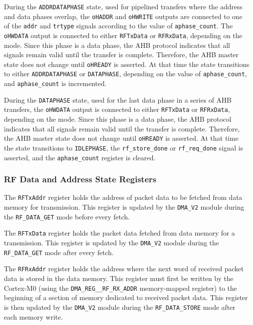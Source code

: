 During the \texttt{ADDRDATAPHASE} state, used for pipelined transfers where the address and data phases overlap, the \texttt{oHADDR} and \texttt{oHWRITE} outputs are connected to one of the \texttt{addr} and \texttt{trtype} signals according to the value of \texttt{aphase\_count}. The \texttt{oHWDATA} output is connected to either \texttt{RFTxData} or \texttt{RFRxData}, depending on the mode. Since this phase is a data phase, the AHB protocol indicates that all signals remain valid until the transfer is complete. Therefore, the AHB master state does not change until \texttt{oHREADY} is asserted. At that time the state transitions to either \texttt{ADDRDATAPHASE} or \texttt{DATAPHASE}, depending on the value of \texttt{aphase\_count}, and \texttt{aphase\_count} is incremented.

During the \texttt{DATAPHASE} state, used for the last data phase in a series of AHB transfers, the \texttt{oHWDATA} output is connected to either \texttt{RFTxData} or \texttt{RFRxData}, depending on the mode. Since this phase is a data phase, the AHB protocol indicates that all signals remain valid until the transfer is complete. Therefore, the AHB master state does not change until \texttt{oHREADY} is asserted. At that time the state transitions to \texttt{IDLEPHASE}, the \texttt{rf\_store\_done} or \texttt{rf\_req\_done} signal is asserted, and the \texttt{aphase\_count} register is cleared.

\subsubsection{RF Data and Address State Registers}

The \texttt{RFTxAddr} register holds the address of packet data to be fetched from data memory for transmission. This register is updated by the \texttt{DMA\_V2} module during the \texttt{RF\_DATA\_GET} mode before every fetch.

The \texttt{RFTxData} register holds the packet data fetched from data memory for a transmission. This register is updated by the \texttt{DMA\_V2} module during the \texttt{RF\_DATA\-\_GET} mode after every fetch.

The \texttt{RFRxAddr} register holds the address where the next word of received packet data is stored in the data memory. This register must first be written by the Cortex-M0 (using the \texttt{DMA\_REG\_\_RF\_RX\_ADDR} memory-mapped register) to the beginning of a section of memory dedicated to received packet data. This register is then updated by the \texttt{DMA\_V2} module during the \texttt{RF\_DATA\_STORE} mode after each memory write.

